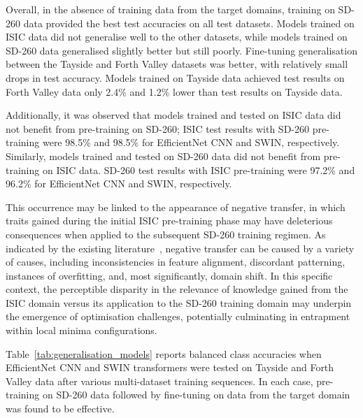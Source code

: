 Overall, in the absence of training data from the target domains, training on SD-260 data provided the best test accuracies on all test datasets. Models trained on ISIC data did not generalise well to the other datasets, while models trained on SD-260 data generalised slightly better but still poorly. Fine-tuning generalisation between the Tayside and Forth Valley datasets was better, with relatively small drops in test accuracy. Models trained on Tayside data achieved test results on Forth Valley data only 2.4\% and 1.2\% lower than test results on Tayside data.

Additionally, it was observed that models trained and tested on ISIC data did not benefit from pre-training on SD-260; ISIC test results with SD-260 pre-training were 98.5\% and 98.5\% for EfficientNet CNN and SWIN, respectively. Similarly, models trained and tested on SD-260 data did not benefit from pre-training on ISIC data. SD-260 test results with ISIC pre-training were 97.2\% and 96.2\% for EfficientNet CNN and SWIN, respectively.

This occurrence may be linked to the appearance of negative transfer, in which traits gained during the initial ISIC pre-training phase may have deleterious consequences when applied to the subsequent SD-260 training regimen. As indicated by the existing literature~\citep{wang2019characterizing}, negative transfer can be caused by a variety of causes, including inconsistencies in feature alignment, discordant patterning, instances of overfitting, and, most significantly, domain shift. In this specific context, the perceptible disparity in the relevance of knowledge gained from the ISIC domain versus its application to the SD-260 training domain may underpin the emergence of optimisation challenges, potentially culminating in entrapment within local minima configurations.

Table~\ref{tab:generalisation_models} reports balanced class accuracies when EfficientNet CNN and SWIN transformers were tested on Tayside and Forth Valley data after various multi-dataset training sequences. In each case, pre-training on SD-260 data followed by fine-tuning on data from the target domain was found to be effective.

